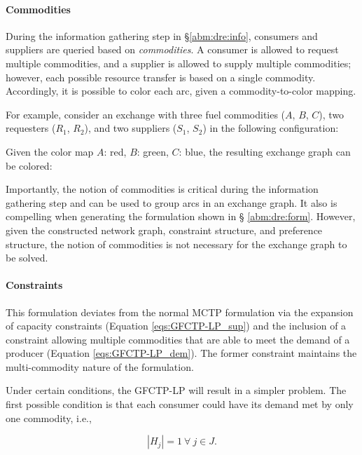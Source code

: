 \paragraph{Commodities}

During the information gathering step in \S \ref{abm:dre:info}, consumers and
suppliers are queried based on \textit{commodities}. A consumer is allowed to
request multiple commodities, and a supplier is allowed to supply multiple
commodities; however, each possible resource transfer is based on a single
commodity. Accordingly, it is possible to color each arc, given a
commodity-to-color mapping.

For example, consider an exchange with three fuel commodities ($A$, $B$, $C$),
two requesters ($R_1$, $R_2$), and two suppliers ($S_1$, $S_2$) in the following
configuration:


Given the color map $A$: red, $B$: green, $C$: blue, the resulting exchange
graph can be colored:


Importantly, the notion of commodities is critical during the information
gathering step and can be used to group arcs in an exchange graph. It also is
compelling when generating the formulation shown in \S
\ref{abm:dre:form}. However, given the constructed network graph, constraint
structure, and preference structure, the notion of commodities is not necessary
for the exchange graph to be solved.

\paragraph{Constraints}

This formulation deviates from the normal MCTP formulation via the expansion of
capacity constraints (Equation \ref{eqs:GFCTP-LP_sup}) and the inclusion of a
constraint allowing multiple commodities that are able to meet the demand of a
producer (Equation \ref{eqs:GFCTP-LP_dem}). The former constraint maintains the
multi-commodity nature of the formulation. 

Under certain conditions, the GFCTP-LP will result in a simpler problem. The
first possible condition is that each consumer could have its demand met by only
one commodity, i.e.,

\begin{equation}\label{eqs:1demand}
  \left|{H_{j}}\right| = 1 \: \forall \: j \in J.
\end{equation}

